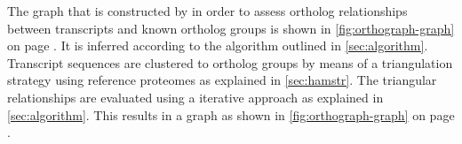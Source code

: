 \label{sec:graph}

The graph that is constructed by \pname in order to assess ortholog
relationships between transcripts and known ortholog groups is shown in
\autoref{fig:orthograph-graph} on page \pageref{fig:graph}. It is inferred
according to the algorithm outlined in \autoref{sec:algorithm}. Transcript
sequences are clustered to ortholog groups by means of a triangulation strategy
using reference proteomes as explained in \autoref{sec:hamstr}. The triangular
relationships are evaluated using a iterative approach as explained in
\autoref{sec:algorithm}. This results in a graph as shown in
\autoref{fig:orthograph-graph} on page \pageref{fig:orthograph-graph}.



